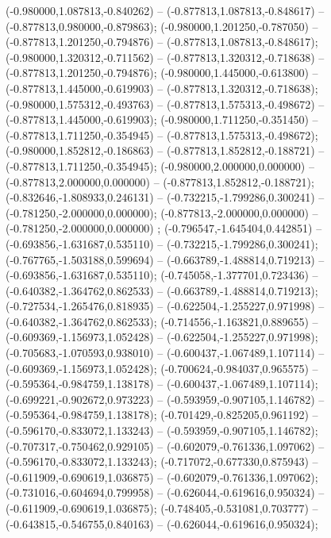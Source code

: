  (-0.980000,1.087813,-0.840262) -- (-0.877813,1.087813,-0.848617) -- (-0.877813,0.980000,-0.879863);
 (-0.980000,1.201250,-0.787050) -- (-0.877813,1.201250,-0.794876) -- (-0.877813,1.087813,-0.848617);
 (-0.980000,1.320312,-0.711562) -- (-0.877813,1.320312,-0.718638) -- (-0.877813,1.201250,-0.794876);
 (-0.980000,1.445000,-0.613800) -- (-0.877813,1.445000,-0.619903) -- (-0.877813,1.320312,-0.718638);
 (-0.980000,1.575312,-0.493763) -- (-0.877813,1.575313,-0.498672) -- (-0.877813,1.445000,-0.619903);
 (-0.980000,1.711250,-0.351450) -- (-0.877813,1.711250,-0.354945) -- (-0.877813,1.575313,-0.498672);
 (-0.980000,1.852812,-0.186863) -- (-0.877813,1.852812,-0.188721) -- (-0.877813,1.711250,-0.354945);
 (-0.980000,2.000000,0.000000) -- (-0.877813,2.000000,0.000000) -- (-0.877813,1.852812,-0.188721);
 (-0.832646,-1.808933,0.246131) -- (-0.732215,-1.799286,0.300241) -- (-0.781250,-2.000000,0.000000);
 (-0.877813,-2.000000,0.000000) -- (-0.781250,-2.000000,0.000000) ;
 (-0.796547,-1.645404,0.442851) -- (-0.693856,-1.631687,0.535110) -- (-0.732215,-1.799286,0.300241);
 (-0.767765,-1.503188,0.599694) -- (-0.663789,-1.488814,0.719213) -- (-0.693856,-1.631687,0.535110);
 (-0.745058,-1.377701,0.723436) -- (-0.640382,-1.364762,0.862533) -- (-0.663789,-1.488814,0.719213);
 (-0.727534,-1.265476,0.818935) -- (-0.622504,-1.255227,0.971998) -- (-0.640382,-1.364762,0.862533);
 (-0.714556,-1.163821,0.889655) -- (-0.609369,-1.156973,1.052428) -- (-0.622504,-1.255227,0.971998);
 (-0.705683,-1.070593,0.938010) -- (-0.600437,-1.067489,1.107114) -- (-0.609369,-1.156973,1.052428);
 (-0.700624,-0.984037,0.965575) -- (-0.595364,-0.984759,1.138178) -- (-0.600437,-1.067489,1.107114);
 (-0.699221,-0.902672,0.973223) -- (-0.593959,-0.907105,1.146782) -- (-0.595364,-0.984759,1.138178);
 (-0.701429,-0.825205,0.961192) -- (-0.596170,-0.833072,1.133243) -- (-0.593959,-0.907105,1.146782);
 (-0.707317,-0.750462,0.929105) -- (-0.602079,-0.761336,1.097062) -- (-0.596170,-0.833072,1.133243);
 (-0.717072,-0.677330,0.875943) -- (-0.611909,-0.690619,1.036875) -- (-0.602079,-0.761336,1.097062);
 (-0.731016,-0.604694,0.799958) -- (-0.626044,-0.619616,0.950324) -- (-0.611909,-0.690619,1.036875);
 (-0.748405,-0.531081,0.703777) -- (-0.643815,-0.546755,0.840163) -- (-0.626044,-0.619616,0.950324);
